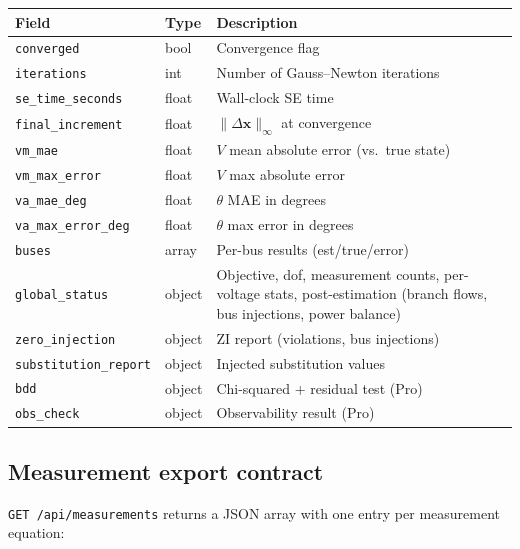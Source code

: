 \documentclass[11pt,a4paper]{article}
\begin{document}
\begin{center}
\small
\begin{tabular}{llp{50mm}}
  \toprule
  \textbf{Field} & \textbf{Type} & \textbf{Description} \\
  \midrule
  \texttt{converged}       & bool    & Convergence flag \\
  \texttt{iterations}      & int     & Number of Gauss--Newton iterations \\
  \texttt{se\_time\_seconds} & float & Wall-clock SE time \\
  \texttt{final\_increment} & float  & $\|\Delta\mathbf{x}\|_\infty$ at convergence \\
  \texttt{vm\_mae}          & float  & $V$ mean absolute error (vs.\ true state) \\
  \texttt{vm\_max\_error}   & float  & $V$ max absolute error \\
  \texttt{va\_mae\_deg}     & float  & $\theta$ MAE in degrees \\
  \texttt{va\_max\_error\_deg} & float & $\theta$ max error in degrees \\
  \texttt{buses}           & array   & Per-bus results (est/true/error) \\
  \texttt{global\_status}  & object  & Objective, dof, measurement counts,
    per-voltage stats, post-estimation (branch flows, bus injections,
    power balance) \\
  \texttt{zero\_injection} & object  & ZI report (violations, bus injections) \\
  \texttt{substitution\_report} & object & Injected substitution values \\
  \texttt{bdd}             & object  & Chi-squared + residual test (Pro) \\
  \texttt{obs\_check}      & object  & Observability result (Pro) \\
  \bottomrule
\end{tabular}
\end{center}

\subsection{Measurement export contract}

\texttt{GET /api/measurements} returns a JSON array with one entry per
measurement equation:
\end{document}
